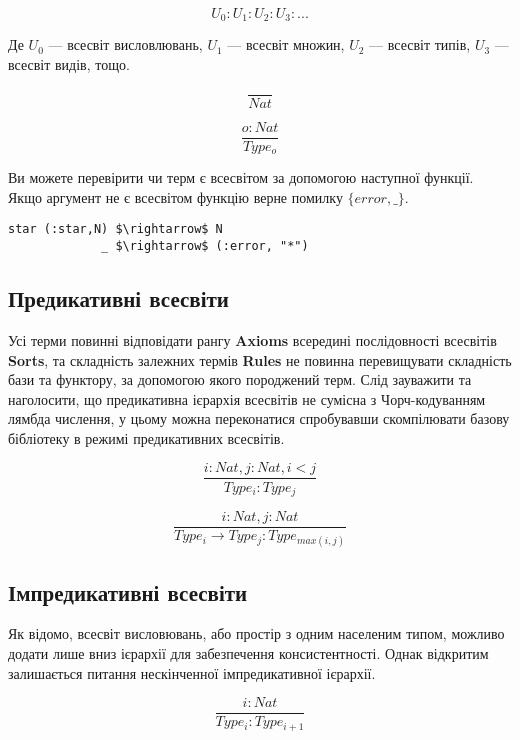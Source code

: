 \documentclass{article}
\begin{document}
$$
U_0 : U_1 : U_2 : U_3 : ...
$$

Де $U_0$ --- всесвіт висловлювань, $U_1$ --- всесвіт множин, $U_2$ --- всесвіт типів, $U_3$ --- всесвіт видів, тощо.

\begin{equation}
\tag{I}
\dfrac
{}
{Nat}
\end{equation}

\begin{equation}
\tag{S}
\dfrac
{o : Nat}
{Type_o}
\end{equation}

Ви можете перевірити чи терм є всесвітом за допомогою наступної функції. Якщо аргумент не є всесвітом функцію верне помилку  $\{error,\_\}$.

\begin{lstlisting}[mathescape=true]
star (:star,N) $\rightarrow$ N
             _ $\rightarrow$ (:error, "*")
\end{lstlisting}

\subsection{Предикативні всесвіти}

Усі терми повинні відповідати рангу {\bf Axioms} всередині послідовності всесвітів {\bf Sorts}, та складність залежних
термів {\bf Rules} не повинна перевищувати складність бази та функтору, за допомогою якого породжений терм.
Слід зауважити та наголосити, що предикативна ієрархія всесвітів не сумісна з Чорч-кодуванням лямбда числення, у цьому можна
переконатися спробувавши скомпілювати базову бібліотеку в режимі предикативних всесвітів.

\[
\tag{$A_1$}
\dfrac{i: Nat, j: Nat, i < j}{Type_i : Type_j}
\]

\[
\tag{$R_1$}
\dfrac{i : Nat, j : Nat}{Type_i \rightarrow Type_j : Type_{max(i,j)} }
\]

\subsection{Імпредикативні всесвіти}

Як відомо, всесвіт висловювань, або простір з одним населеним типом, можливо додати лише вниз ієрархії для забезпечення консистентності.
Однак відкритим залишається питання нескінченної імпредикативної ієрархії.

\begin{equation}
\tag{$A_2$}
\dfrac
{i: Nat}
{Type_i : Type_{i+1}}
\end{equation}
\end{document}
